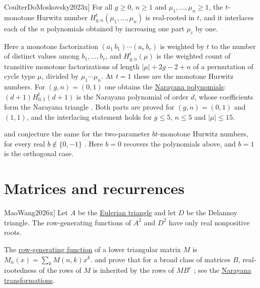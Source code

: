 \begin{conjecture}[Coulter--Do--Moskovsky, \cite[Conjs.~3.13--3.14]{CoulterDoMoskovsky2023x}]
\label{conjMonotoneHurwitz}
For all $g\geq0$, $n\geq1$ and $\mu_1,\dotsc,\mu_n\geq1$, the $t$-monotone
Hurwitz number $H^t_{g,n}(\mu_1,\dotsc,\mu_n)$ is real-rooted in $t$, and
it interlaces each of the $n$ polynomials obtained by increasing one part
$\mu_i$ by one.
\end{conjecture}

Here a monotone factorization $(a_1\,b_1)\dotsm(a_r\,b_r)$ is weighted by
$t$ to the number of distinct values among $b_1,\dotsc,b_r$, and
$H^t_{g,n}(\mu)$ is the weighted count of transitive monotone factorizations
of length $|\mu|+2g-2+n$ of a permutation of cycle type $\mu$, divided by
$\mu_1\dotsm\mu_n$.  At $t=1$ these are the monotone Hurwitz numbers.  For
$(g,n)=(0,1)$ one obtains the \hyperref[classicalNarayanaPolynomialsRealRooted]{Narayana
polynomials}: $(d+1)H^t_{0,1}(d+1)$ is the Narayana polynomial of order
$d$, whose coefficients form the Narayana triangle .  Both
parts are proved for $(g,n)=(0,1)$ and $(1,1)$, and the interlacing
statement holds for $g\leq5$, $n\leq5$ and $|\mu|\leq15$.

 and  conjecture the same for the
two-parameter $bt$-monotone Hurwitz numbers, for every real
$b\notin\{0,-1\}$ \cite[Conjs.~4.21--4.22]{CoulterDo2025x}.  Here $b=0$
recovers the polynomials above, and $b=1$ is the orthogonal case.


\section[openProblemsTransformations]{Matrices and recurrences}

\begin{conjecture}[Mao--Wang, \cite[Conj.~4.1]{MaoWang2026x}]
\label{conj:eulerianDelannoySquares}
Let $A$ be the \hyperref[eulerianPolynomial]{Eulerian triangle} and let $D$
be the Delannoy triangle.
The row-generating functions of $A^2$ and $D^2$ have only real
nonpositive roots.
\end{conjecture}

The \hyperref[rowGeneratingFunction]{row-generating function} of a lower
triangular matrix $M$ is $M_n(x)=\sum_kM(n,k)x^k$.   and
 prove that for a broad class of matrices $B$,
real-rootedness of the rows of $M$ is inherited by the rows of $MB^r$
\cite[Thm.~1.3]{MaoWang2026x}; see the
\hyperref[narayanaTransformations]{Narayana transformations}.

